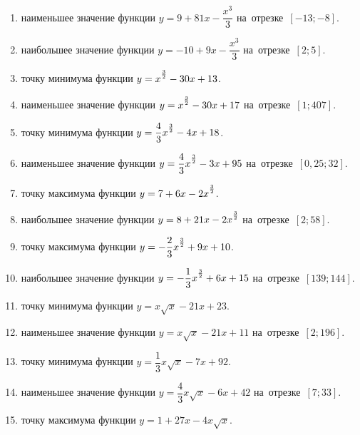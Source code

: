 \documentclass[a4paper,10pt]{article}
\begin{document}
\begin{enumerate}
\item {} наименьшее значение функции $y=9 +81x-\dfrac{x^3}{3}$ на~отрезке~$\left[-13;-8\right]$.

\item {} наибольшее значение функции $y=-10 +9x-\dfrac{x^3}{3}$ на~отрезке~$\left[2;5\right]$.

\item {} точку минимума функции $y=x\strut^{\frac{3}{2}} -30x+13$.

\item {} наименьшее значение функции $y=x\strut^{\frac{3}{2}} -30x+17$ на~отрезке~$\left[1;407\right]$.

\item {} точку минимума функции $y=\dfrac{4}{3}x\strut^{\frac{3}{2}} -4x+18$.

\item {} наименьшее значение функции $y=\dfrac{4}{3}x\strut^{\frac{3}{2}} -3x+95$ на~отрезке~$\left[0,25;32\right]$.

\item {} точку максимума функции $y=7+6x-2x\strut^{\frac{3}{2}}$.

\item {} наибольшее значение функции $y=8+21x-2x\strut^{\frac{3}{2}}$ на~отрезке~$\left[2;58\right]$.

\item {} точку максимума функции $y=-\dfrac{2}{3}x\strut^{\frac{3}{2}} +9x+10$.

\item {} наибольшее значение функции $y=-\dfrac{1}{3}x\strut^{\frac{3}{2}} +6x+15$ на~отрезке~$\left[139;144\right]$.

\item {} точку минимума функции $y=x\sqrt{x} -21x+23$.

\item {} наименьшее значение функции $y=x\sqrt{x} -21x+11$ на~отрезке~$\left[2;196\right]$.

\item {} точку минимума функции $y=\dfrac{1}{3}x\sqrt{x} -7x+92$.

\item {} наименьшее значение функции $y=\dfrac{4}{3}x\sqrt{x} -6x+42$ на~отрезке~$\left[7;33\right]$.

\item {} точку максимума функции $y=1+27x -4x\sqrt{x}$.


\end{enumerate}
\end{document}
